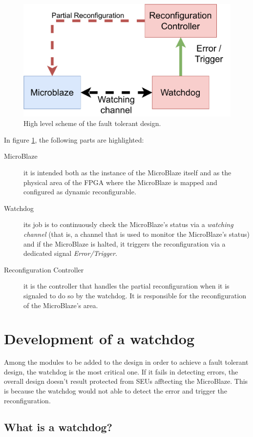 \begin{figure}[H]
\centering
\includegraphics[width=0.8\linewidth]{images/chapter4/reconf_scheme.pdf}
\caption{High level scheme of the fault tolerant design.}
\label{fig:reconf_scheme}
\end{figure}

In figure \ref{fig:reconf_scheme}, the following parts are highlighted:
\begin{description}
    \item[MicroBlaze] it is intended both as the instance of the MicroBlaze itself and as the physical area of the FPGA where the MicroBlaze is mapped and configured as dynamic reconfigurable.
    \item[Watchdog] its job is to continuously check the MicroBlaze's status via a \textit{watching channel} (that is, a channel that is used to monitor the MicroBlaze's status) and if the MicroBlaze is halted, it triggers the reconfiguration via a dedicated signal \textit{Error/Trigger}.
    \item[Reconfiguration Controller] it is the controller that handles the partial reconfiguration when it is signaled to do so by the watchdog. It is responsible for the reconfiguration of the MicroBlaze's area.
\end{description}

\section{Development of a watchdog}

Among the modules to be added to the design in order to achieve a fault tolerant design, the watchdog is the most critical one. If it fails in detecting errors, the overall design doesn't result protected from SEUs afftecting the MicroBlaze. This is because the watchdog would not able to detect the error and trigger the reconfiguration. 

\subsection{What is a watchdog?}

